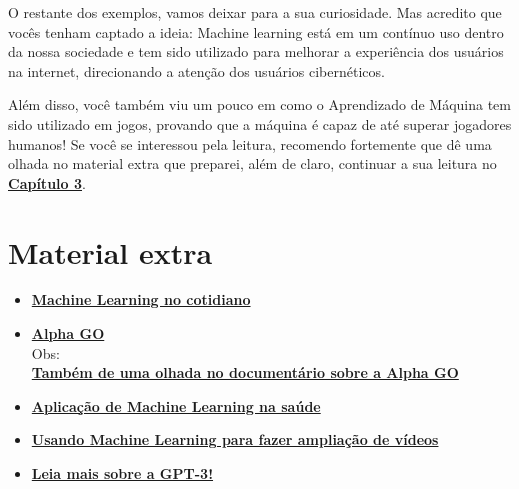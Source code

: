 \documentclass[12pt]{article}
\begin{document}
    O restante dos exemplos, vamos deixar para a sua curiosidade. Mas acredito que 
    vocês tenham captado a ideia: Machine learning está em um contínuo uso dentro da 
    nossa sociedade e tem sido utilizado para melhorar a experiência dos usuários na internet, 
    direcionando a atenção dos usuários cibernéticos.

    Além disso, você também viu um pouco em como o Aprendizado de Máquina
    tem sido utilizado em jogos, provando que a máquina é capaz de até superar jogadores
    humanos! Se você se interessou pela leitura, recomendo fortemente que dê
    uma olhada no material extra que preparei, além de claro, continuar a sua leitura
    no \href{run:../Capitulo_03/Capitulo03.pdf}{\textbf{Capítulo 3}}.


    \newpage
    \section*{\centering Material extra}\label{sec:extra} %

    \begin{itemize}
        \item \href{http://datascienceacademy.com.br/blog/17-casos-de-uso-de-machine-learning/}{\textbf{Machine Learning no cotidiano}}
        \item \href{https://deepmind.com/research/case-studies/alphago-the-story-so-far}{\textbf{Alpha GO}} \\ Obs: \\ \href{https://youtu.be/WXuK6gekU1Y}{\textbf{Também de uma olhada no documentário sobre a Alpha GO}}
        \item \href{https://youtu.be/uGYJuOyIvzs}{\textbf{Aplicação de Machine Learning na saúde}}
        \item \href{https://youtu.be/AwmvwTopbas}{\textbf{Usando Machine Learning para fazer ampliação de vídeos}}
        \item \href{https://forbes.com.br/forbes-insider/2020/07/por-que-o-programa-de-inteligencia-artificial-gpt-3-e-incrivel-mas-superestimado/}{\textbf{Leia mais sobre a GPT-3!}}
    \end{itemize}

    \newpage
\end{document}
